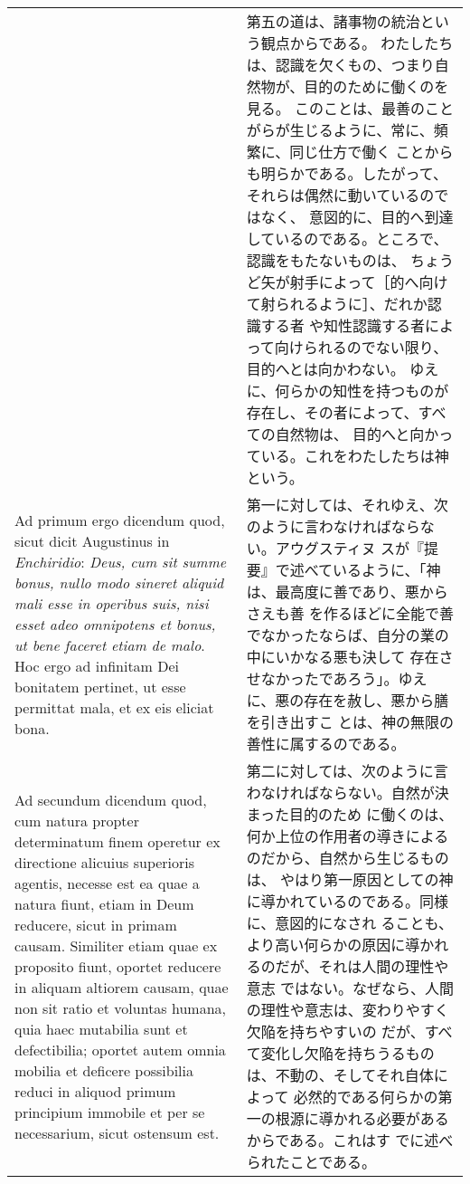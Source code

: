 \documentclass[10pt]{jsarticle} %
\begin{document}
\begin{longtable}{p{21em}p{21em}}
&




第五の道は、諸事物の統治という観点からである。
わたしたちは、認識を欠くもの、つまり自然物が、目的のために働くのを見る。
 このことは、最善のことがらが生じるように、常に、頻繁に、同じ仕方で働く
 ことからも明らかである。したがって、それらは偶然に動いているのではなく、
 意図的に、目的へ到達しているのである。ところで、認識をもたないものは、
 ちょうど矢が射手によって［的へ向けて射られるように］、だれか認識する者
 や知性認識する者によって向けられるのでない限り、目的へとは向かわない。
ゆえに、何らかの知性を持つものが存在し、その者によって、すべての自然物は、
 目的へと向かっている。これをわたしたちは神という。


\\


{\sc Ad primum ergo dicendum} quod, sicut dicit Augustinus in {\it
Enchiridio}: {\it Deus, cum sit summe bonus, nullo modo sineret aliquid
mali esse in operibus suis, nisi esset adeo omnipotens et bonus, ut bene
faceret etiam de malo}. Hoc ergo ad infinitam Dei bonitatem pertinet, ut
esse permittat mala, et ex eis eliciat bona.


&

第一に対しては、それゆえ、次のように言わなければならない。アウグスティヌ
 スが『提要』で述べているように、「神は、最高度に善であり、悪からさえも善
 を作るほどに全能で善でなかったならば、自分の業の中にいかなる悪も決して
 存在させなかったであろう」。ゆえに、悪の存在を赦し、悪から膳を引き出すこ
 とは、神の無限の善性に属するのである。


\\


{\sc Ad secundum dicendum} quod, cum natura propter
determinatum finem operetur ex directione alicuius superioris agentis,
necesse est ea quae a natura fiunt, etiam in Deum reducere, sicut in
primam causam. Similiter etiam quae ex proposito fiunt, oportet reducere
in aliquam altiorem causam, quae non sit ratio et voluntas humana, quia
haec mutabilia sunt et defectibilia; oportet autem omnia mobilia et
deficere possibilia reduci in aliquod primum principium immobile et per
se necessarium, sicut ostensum est.


&
第二に対しては、次のように言わなければならない。自然が決まった目的のため
 に働くのは、何か上位の作用者の導きによるのだから、自然から生じるものは、
 やはり第一原因としての神に導かれているのである。同様に、意図的になされ
 ることも、より高い何らかの原因に導かれるのだが、それは人間の理性や意志
 ではない。なぜなら、人間の理性や意志は、変わりやすく欠陥を持ちやすいの
 だが、すべて変化し欠陥を持ちうるものは、不動の、そしてそれ自体によって
 必然的である何らかの第一の根源に導かれる必要があるからである。これはす
 でに述べられたことである。





\end{longtable}
\end{document}
